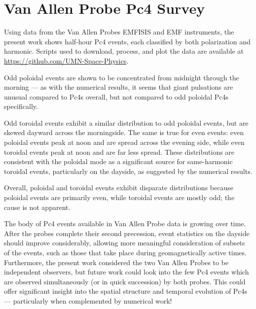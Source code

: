 



\section{Van Allen Probe Pc4 Survey}

Using data from the Van Allen Probes EMFISIS and EMF instruments, the present
work shows  half-hour Pc4 events, each classified by both polarization
and harmonic. Scripts used to download, process, and plot the data are
available at \url{https://github.com/UMN-Space-Physics}. 

Odd poloidal events are shown to be concentrated from midnight through the
morning --- as with the numerical results, it seems that giant pulsations are
unusual compared to Pc4s overall, but not compared to odd poloidal Pc4s
specifically. 

Odd toroidal events exhibit a similar distribution to odd poloidal events, but
are skewed dayward across the morningside. The same is true for even events:
even poloidal events peak at noon and are spread across the evening side, while
even toroidal events peak at noon and are far less spread. These distributions
are consistent with the poloidal mode as a significant source for same-harmonic
toroidal events, particularly on the dayside, as suggested by the numerical
results. 

Overall, poloidal and toroidal events exhibit disparate distributions because
poloidal events are primarily even, while toroidal events are mostly odd; the
cause is not apparent. 

The body of Pc4 events available in Van Allen Probe data is growing over time.
After the probes complete their second precession, event statistics on the
dayside should improve considerably, allowing more meaningful consideration of
subsets of the events, such as those that take place during geomagnetically
active times. Furthermore, the present work considered the two Van Allen Probes
to be independent observers, but future work could look into the few Pc4 events
which are observed simultaneously (or in quick succession) by both probes. This
could offer significant insight into the spatial structure and temporal
evolution of Pc4s --- particularly when complemented by numerical work! 










